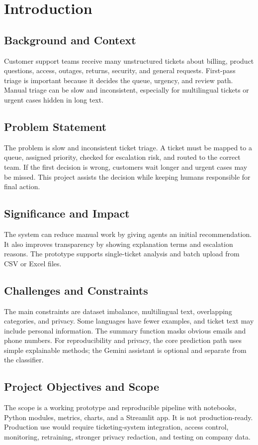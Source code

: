 \documentclass[11pt,a4paper]{article}
\begin{document}
\section{Introduction}
\subsection{Background and Context}
Customer support teams receive many unstructured tickets about billing, product questions, access, outages, returns, security, and general requests. First-pass triage is important because it decides the queue, urgency, and review path. Manual triage can be slow and inconsistent, especially for multilingual tickets or urgent cases hidden in long text.

\subsection{Problem Statement}
The problem is slow and inconsistent ticket triage. A ticket must be mapped to a queue, assigned priority, checked for escalation risk, and routed to the correct team. If the first decision is wrong, customers wait longer and urgent cases may be missed. This project assists the decision while keeping humans responsible for final action.

\subsection{Significance and Impact}
The system can reduce manual work by giving agents an initial recommendation. It also improves transparency by showing explanation terms and escalation reasons. The prototype supports single-ticket analysis and batch upload from CSV or Excel files.

\subsection{Challenges and Constraints}
The main constraints are dataset imbalance, multilingual text, overlapping categories, and privacy. Some languages have fewer examples, and ticket text may include personal information. The summary function masks obvious emails and phone numbers. For reproducibility and privacy, the core prediction path uses simple explainable methods; the Gemini assistant is optional and separate from the classifier.

\subsection{Project Objectives and Scope}
The scope is a working prototype and reproducible pipeline with notebooks, Python modules, metrics, charts, and a Streamlit app. It is not production-ready. Production use would require ticketing-system integration, access control, monitoring, retraining, stronger privacy redaction, and testing on company data.
\end{document}

